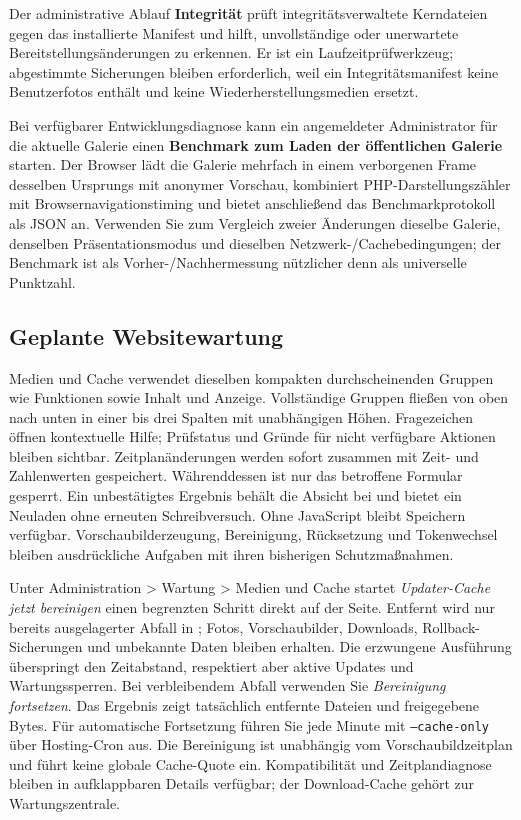 \documentclass[11pt,a4paper]{article}
\newcommand{\filepath}[1]{\path{#1}}
\newcommand{\ui}[1]{\textbf{#1}}
\begin{document}
Der administrative Ablauf \ui{Integrität} prüft integritätsverwaltete
Kerndateien gegen das installierte Manifest und hilft, unvollständige oder
unerwartete Bereitstellungsänderungen zu erkennen. Er ist ein
Laufzeitprüfwerkzeug; abgestimmte Sicherungen bleiben erforderlich, weil ein
Integritätsmanifest keine Benutzerfotos enthält und keine
Wiederherstellungsmedien ersetzt.

Bei verfügbarer Entwicklungsdiagnose kann ein angemeldeter Administrator für die
aktuelle Galerie einen \ui{Benchmark zum Laden der öffentlichen Galerie}
starten. Der Browser lädt die Galerie mehrfach in einem verborgenen Frame
desselben Ursprungs mit anonymer Vorschau, kombiniert PHP-Darstellungszähler mit
Browsernavigationstiming und bietet anschließend das Benchmarkprotokoll als JSON
an. Verwenden Sie zum Vergleich zweier Änderungen dieselbe Galerie, denselben
Präsentationsmodus und dieselben Netzwerk-/Cachebedingungen; der Benchmark ist
als Vorher-/Nachhermessung nützlicher denn als universelle Punktzahl.

\subsection{Geplante Websitewartung}

Medien und Cache verwendet dieselben kompakten durchscheinenden Gruppen wie
Funktionen sowie Inhalt und Anzeige. Vollständige Gruppen fließen von oben
nach unten in einer bis drei Spalten mit unabhängigen Höhen. Fragezeichen
öffnen kontextuelle Hilfe; Prüfstatus und Gründe für nicht verfügbare Aktionen
bleiben sichtbar. Zeitplanänderungen werden sofort zusammen mit Zeit- und
Zahlenwerten gespeichert. Währenddessen ist nur das betroffene Formular
gesperrt. Ein unbestätigtes Ergebnis behält die Absicht bei und bietet ein
Neuladen ohne erneuten Schreibversuch. Ohne JavaScript bleibt Speichern
verfügbar. Vorschaubilderzeugung, Bereinigung, Rücksetzung und Tokenwechsel
bleiben ausdrückliche Aufgaben mit ihren bisherigen Schutzmaßnahmen.

Unter Administration > Wartung > Medien und Cache startet \emph{Updater-Cache
jetzt bereinigen} einen begrenzten Schritt direkt auf der Seite. Entfernt wird
nur bereits ausgelagerter Abfall in \filepath{cache/updates/prune-trash}; Fotos,
Vorschaubilder, Downloads, Rollback-Sicherungen und unbekannte Daten bleiben
erhalten. Die erzwungene Ausführung überspringt den Zeitabstand, respektiert
aber
aktive Updates und Wartungssperren. Bei verbleibendem Abfall verwenden Sie
\emph{Bereinigung fortsetzen}. Das Ergebnis zeigt tatsächlich entfernte Dateien
und freigegebene Bytes. Für automatische Fortsetzung führen Sie jede Minute
\filepath{scripts/site_maintenance.php} mit \texttt{--cache-only} über
Hosting-Cron
aus. Die Bereinigung ist unabhängig vom Vorschaubildzeitplan und führt keine
globale Cache-Quote ein. Kompatibilität und Zeitplandiagnose bleiben in
aufklappbaren Details verfügbar; der Download-Cache gehört zur Wartungszentrale.
\end{document}
